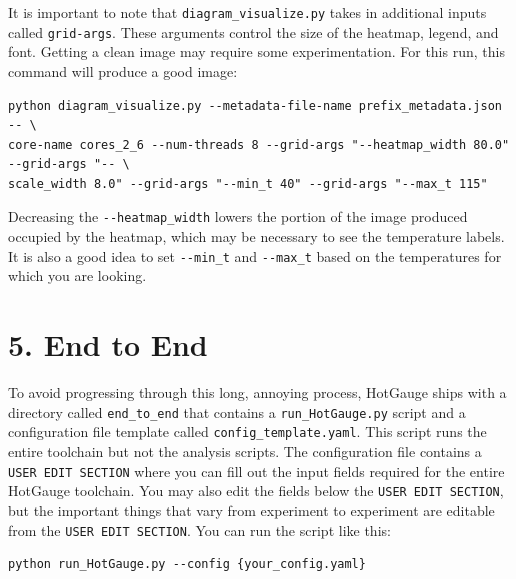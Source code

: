 \documentclass[11pt]{article}
\begin{document}
It is important to note that \verb|diagram_visualize.py| takes in additional inputs called \verb|grid-args|. These arguments control the size of the heatmap, legend, and font. Getting a clean image may require some experimentation. For this run, this command will produce a good image: 

\begin{lstlisting}
python diagram_visualize.py --metadata-file-name prefix_metadata.json -- \
core-name cores_2_6 --num-threads 8 --grid-args "--heatmap_width 80.0" --grid-args "-- \
scale_width 8.0" --grid-args "--min_t 40" --grid-args "--max_t 115" 
\end{lstlisting}

Decreasing the \verb|--heatmap_width| lowers the portion of the image produced occupied by the heatmap, which may be necessary to see the temperature labels. It is also a good idea to set \verb|--min_t| and \verb|--max_t| based on the temperatures for which you are looking.

\section*{5. End to End}

To avoid progressing through this long, annoying process, HotGauge ships with a directory called \verb|end_to_end| that contains a \verb|run_HotGauge.py| script and a configuration file template called \verb|config_template.yaml|. This script runs the entire toolchain but not the analysis scripts. The configuration file contains a \verb|USER EDIT SECTION| where you can fill out the input fields required for the entire HotGauge toolchain. You may also edit the fields below the \verb|USER EDIT SECTION|, but the important things that vary from experiment to experiment are editable from the \verb|USER EDIT SECTION|. You can run the script like this: 
\begin{lstlisting}
python run_HotGauge.py --config {your_config.yaml} 
\end{lstlisting}
 
\end{document}

